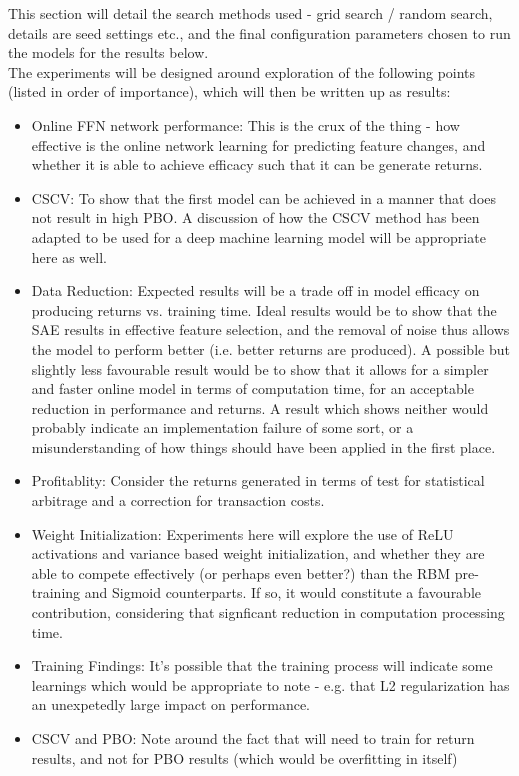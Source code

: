 \documentclass[a4paper,latin]{paper}
\begin{document}
This section will detail the search methods used - grid search / random search, details are seed settings etc., and the final configuration parameters chosen to run the models for the results below.
~\\\newline
The experiments will be designed around exploration of the following points (listed in order of importance), which will then be written up as results:
\begin{itemize}
	\item Online FFN  network performance: This is the crux of the thing - how effective is the online network learning for predicting feature changes, and whether it is able to achieve efficacy such that it can be generate returns.
	\item CSCV: To show that the first model can be achieved in a manner that does not result in high PBO. A discussion of how the CSCV method has been adapted to be used for a deep machine learning model will be appropriate here as well.
	\item Data Reduction: Expected results will be a trade off in model efficacy on producing returns vs. training time. Ideal results would be to show that the SAE results in effective feature selection, and the removal of noise thus allows the model to perform better (i.e. better returns are produced). A possible but slightly less favourable result would be to show that it allows for a simpler and faster online model in terms of computation time, for an acceptable reduction in performance and returns. A result which shows neither would probably indicate an implementation failure of some sort, or a misunderstanding of how things should have been applied in the first place. 
	\item Profitablity: Consider the returns generated in terms of test for statistical arbitrage and a correction for transaction costs.
	\item Weight Initialization: Experiments here will explore the use of ReLU activations and variance based weight initialization, and whether they are able to compete effectively (or perhaps even better?) than the RBM pre-training and Sigmoid counterparts. If so, it would constitute a favourable  contribution, considering that signficant reduction in computation processing time.
	\item Training Findings: It's possible that the training process will indicate some learnings which would be appropriate to note - e.g. that L2 regularization has an unexpetedly large impact on performance.
	\item CSCV and PBO: Note around the fact that will need to train for return results, and not for PBO results (which would be overfitting in itself)
\end{itemize}
\end{document}
